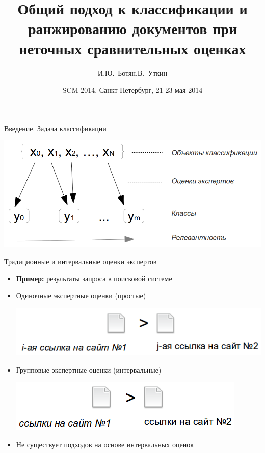 \documentclass[11pt]{beamer}
\title[]{Общий подход к классификации и ранжированию документов при неточных сравнительных оценках}
\author[И.Ю.~Ботян, Л.В.~Уткин]{И.Ю.~Ботян\andЛ.В.~Уткин}
\institute[СПбГЛТУ]{\large Санкт-Петербургский государственный лесотехнический университет}
\date[SCM-2014]{\large SCM-2014, Санкт-Петербург, 21-23 мая 2014}
\begin{document}
\graphicspath{ {./img/} }

\begin{frame}

\titlepage

\end{frame}
\begin{frame}{Введение. Задача классификации}

\begin{itemize}
	\begin{center}
		\includegraphics[scale=0.35]{classification}
	\end{center}
\end{itemize}

\end{frame}
\begin{frame}{Традиционные и интервальные оценки экспертов}

\begin{itemize}
	\item \textbf{Пример:} результаты запроса в поисковой системе
	\item Одиночные экспертные оценки (простые)
		\begin{center}
			\includegraphics[scale=0.4]{simple_judgment}
		\end{center}
	\item Групповые экспертные оценки (интервальные)
		\begin{center}
			\includegraphics[scale=0.4]{interval_judgment}
		\end{center}
	\item \underline{Не существует} подходов на основе интервальных оценок
\end{itemize}

\end{frame}
\end{document}
